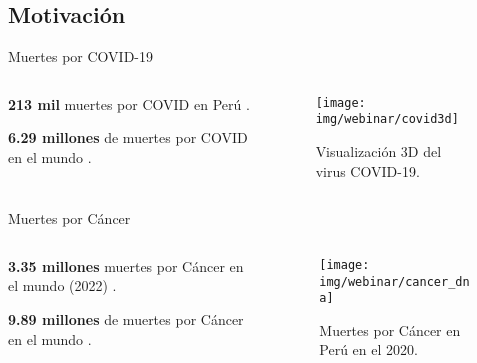 \documentclass[10pt]{beamer}
\newcommand{\1}{
        	\setbeamertemplate{background}{
        		\texttt{[image: img/1]}
        		\tikz[overlay] \fill[fill opacity=0.75,fill=white] (0,0) rectangle (-\paperwidth,\paperheight);
        	}
}
\begin{document}
\subsection{Motivación}

\begin{frame}{Muertes por COVID-19}{}
	\begin{columns}
		\begin{column}{0.48\textwidth}
			\begin{block}{}
				\textbf{213 mil} muertes por COVID en Perú \cite{worldometrcovid2022}.
			\end{block}
			\begin{block}{}
				\textbf{6.29 millones} de muertes por COVID en el mundo \cite{worldometrcovid2022}.
			\end{block}
		\end{column}
		\begin{column}{0.48\textwidth}
			\begin{figure}[]
				\centering
				\texttt{[image: img/webinar/covid3d]}
				\caption{Visualización 3D del virus COVID-19.}
			\end{figure}
		\end{column}
	\end{columns}	
\end{frame}

\begin{frame}{Muertes por Cáncer}{}
	\begin{columns}
		\begin{column}{0.48\textwidth}
			\begin{block}{}
				\textbf{3.35 millones} muertes por Cáncer en el mundo (2022) \cite{worldometrcancer2022}.
			\end{block}
			\begin{block}{}
				\textbf{9.89 millones} de muertes por Cáncer en el mundo \cite{worldometrcancer2022}.
			\end{block}
		\end{column}
		\begin{column}{0.48\textwidth}
			\begin{figure}[]
				\centering
				\texttt{[image: img/webinar/cancer\_dna]}
				\caption{Muertes por Cáncer en Perú en el 2020.}
			\end{figure}
		\end{column}
	\end{columns}	
\end{frame}
\end{document}
